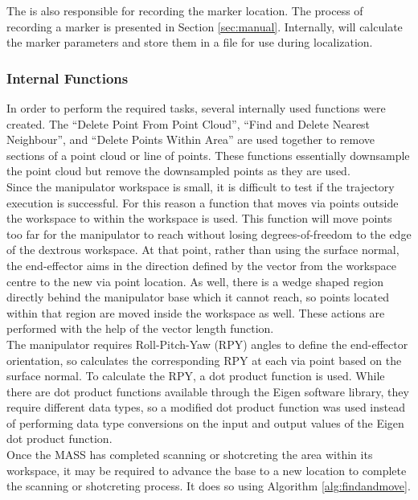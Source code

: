 The  is also responsible for recording the marker location. The process of recording a marker is presented in Section \ref{sec:manual}. Internally,  will calculate the marker parameters and store them in a file for use during localization.\\
\subsubsection{Internal Functions}
In order to perform the required tasks, several internally used functions were created. The ``Delete Point From Point Cloud'', ``Find and Delete Nearest Neighbour'', and ``Delete Points Within Area'' are used together to remove sections of a point cloud or line of points. These functions essentially downsample the point cloud but remove the downsampled points as they are used.\\

Since the manipulator workspace is small, it is difficult to test if the trajectory execution is successful. For this reason a function that moves via points outside the workspace to within the workspace is used. This function will move points too far for the manipulator to reach without losing degrees-of-freedom to the edge of the dextrous workspace. At that point, rather than using the surface normal, the end-effector aims in the direction defined by the vector from the workspace centre to the new via point location. As well, there is a wedge shaped region directly behind the manipulator base which it cannot reach, so points located within that region are moved inside the workspace as well. These actions are performed with the help of the vector length function.\\

The manipulator requires Roll-Pitch-Yaw (RPY) angles to define the end-effector orientation, so  calculates the corresponding RPY at each via point based on the surface normal. To calculate the RPY, a dot product function is used. While there are dot product functions available through the Eigen software library, they require different data types, so a modified dot product function was used instead of performing data type conversions on the input and output values of the Eigen dot product function.\\

Once the MASS has completed scanning or shotcreting the area within its workspace, it may be required to advance the base to a new location to complete the scanning or shotcreting process. It does so using Algorithm \ref{alg:findandmove}.

